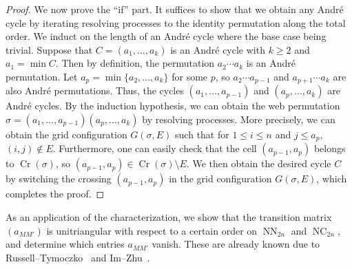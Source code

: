 \documentclass[reqno,12pt]{amsart}
\theoremstyle{definition}
\theoremstyle{remark}
\newcommand\NC{\operatorname{NC}}
\newcommand\NN{\operatorname{NN}}
\newcommand\Cr{\operatorname{Cr}}
\begin{document}
\begin{proof}
  We now prove the ``if'' part. 
  It suffices to show that we obtain any Andr\'e cycle by iterating resolving
  processes to the identity permutation along the total order.
  We induct on the length of an Andr\'e cycle where the base case being trivial.
  Suppose that \( C=(a_1,\dots,a_k) \) is an Andr\'e cycle with \( k\ge 2 \) and
  \( a_1=\min C \). Then by definition, the permutation \( a_2\cdots a_k \) is
  an Andr\'e permutation. Let \( a_p = \min \{a_2,\dots,a_k\} \) for some
  \( p \), so \( a_2\cdots a_{p-1} \) and \( a_{p+1}\cdots a_k \) are also
  Andr\'e permutations. Thus, the cycles \( (a_1,\dots,a_{p-1}) \) and
  \( (a_p, \dots,a_k) \) are Andr\'e cycles.
  By the induction hypothesis, we can obtain the web permutation
  \( \sigma=(a_1,\dots,a_{p-1})(a_p,\dots,a_k) \) by resolving processes.
  More precisely, we can obtain the grid configuration \( G(\sigma, E) \)
  such that for \( 1\le i\le n \) and \( j\le a_p \), \( (i,j)\notin E \).
  Furthermore, one can easily check that the cell \( (a_{p-1}, a_p) \) belongs to
  \( \Cr(\sigma) \), so \( (a_{p-1}, a_p)\in\Cr(\sigma)\setminus E \).
  We then obtain the desired cycle \( C \) by switching the crossing
  \( (a_{p-1}, a_p) \) in the grid configuration \( G(\sigma, E) \),
  which completes the proof.
\end{proof}

As an application of the characterization, we show that the transition matrix
\( (a_{MM'}) \) is unitriangular with respect to a certain order on \( \NN_{2n} \)
and \( \NC_{2n} \), and determine which entries \( a_{MM'} \) vanish.
These are already known due to Russell--Tymoczko~\cite{RT19} and
Im--Zhu~\cite{IZ22}.
\end{document}
